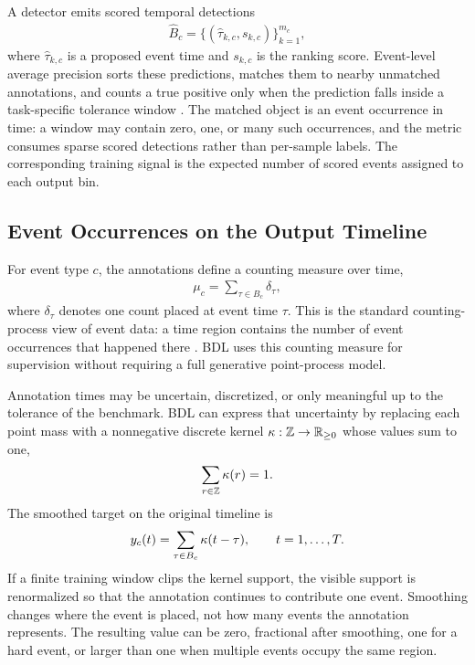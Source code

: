 A detector emits scored temporal detections
\begin{align}
    \widehat{B}_c = \{(\hat{\tau}_{k,c}, s_{k,c})\}_{k=1}^{m_c},
\end{align}
where $\hat{\tau}_{k,c}$ is a proposed event time and $s_{k,c}$ is the ranking score.
Event-level average precision sorts these predictions, matches them to nearby unmatched annotations, and counts a true positive only when the prediction falls inside a task-specific tolerance window \citep{everingham2010pascal,lin2014coco,salles2023,tatbul2018precision}.
The matched object is an event occurrence in time: a window may contain zero, one, or many such occurrences, and the metric consumes sparse scored detections rather than per-sample labels.
The corresponding training signal is the expected number of scored events assigned to each output bin.

\subsection{Event Occurrences on the Output Timeline}
\label{subsec:targets}

For event type $c$, the annotations define a counting measure over time,
\begin{align}
    \mu_c = \sum_{\tau\in B_c}\delta_{\tau},
\end{align}
where $\delta_\tau$ denotes one count placed at event time $\tau$.
This is the standard counting-process view of event data: a time region contains the number of event occurrences that happened there \citep{kingman1993,shchur2021neural}.
BDL uses this counting measure for supervision without requiring a full generative point-process model.

Annotation times may be uncertain, discretized, or only meaningful up to the tolerance of the benchmark.
BDL can express that uncertainty by replacing each point mass with a nonnegative discrete kernel $\kappa:\mathbb{Z}\rightarrow\mathbb{R}_{\ge 0}$ whose values sum to one,
\begin{align}
    \sum_{r\in\mathbb{Z}}\kappa(r)=1.
\end{align}
The smoothed target on the original timeline is
\begin{align}
    y_c(t) = \sum_{\tau\in B_c}\kappa(t-\tau),
    \qquad t=1,\ldots,T.
    \label{eq:smoothed-target}
\end{align}
If a finite training window clips the kernel support, the visible support is renormalized so that the annotation continues to contribute one event.
Smoothing changes where the event is placed, not how many events the annotation represents.
The resulting value can be zero, fractional after smoothing, one for a hard event, or larger than one when multiple events occupy the same region.

